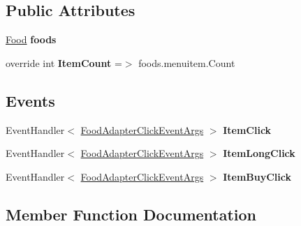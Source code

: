 \subsection*{Public Attributes}
\begin{DoxyCompactItemize}
\item 
\mbox{\label{classst_delivery_1_1_adapter_1_1_food_adapter_a8d3592800a10241fd34225cec7d99426}} 
\hyperlink{classst_delivery_1_1_kitchen_1_1_food}{Food} {\bfseries foods}
\item 
\mbox{\label{classst_delivery_1_1_adapter_1_1_food_adapter_ae291ecd47e3f2e096c3f3ffd3f502b4a}} 
override int {\bfseries Item\+Count} =$>$ foods.\+menuitem.\+Count
\end{DoxyCompactItemize}
\subsection*{Events}
\begin{DoxyCompactItemize}
\item 
\mbox{\label{classst_delivery_1_1_adapter_1_1_food_adapter_a8c04d5d87f2185cecd8ea50c94e19adc}} 
Event\+Handler$<$ \hyperlink{classst_delivery_1_1_adapter_1_1_food_adapter_click_event_args}{Food\+Adapter\+Click\+Event\+Args} $>$ {\bfseries Item\+Click}
\item 
\mbox{\label{classst_delivery_1_1_adapter_1_1_food_adapter_aa54c5b3471d4e1fe85189f72e576612f}} 
Event\+Handler$<$ \hyperlink{classst_delivery_1_1_adapter_1_1_food_adapter_click_event_args}{Food\+Adapter\+Click\+Event\+Args} $>$ {\bfseries Item\+Long\+Click}
\item 
\mbox{\label{classst_delivery_1_1_adapter_1_1_food_adapter_aa6cb49a646acf748d068c7892350b28f}} 
Event\+Handler$<$ \hyperlink{classst_delivery_1_1_adapter_1_1_food_adapter_click_event_args}{Food\+Adapter\+Click\+Event\+Args} $>$ {\bfseries Item\+Buy\+Click}
\end{DoxyCompactItemize}


\subsection{Member Function Documentation}
\mbox{\label{classst_delivery_1_1_adapter_1_1_food_adapter_af08e76c82d89520bc79576508b4f3b9b}} 
